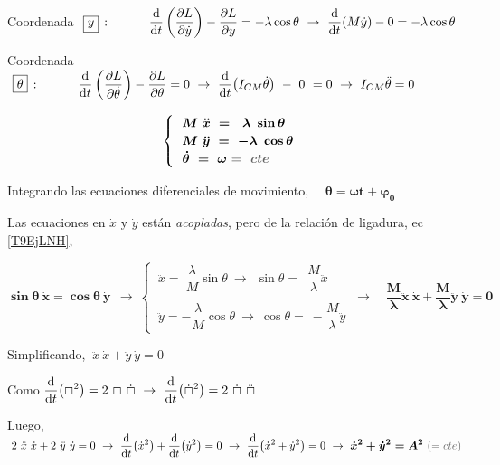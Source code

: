 \begin{example}
Coordenada $\ \boxed{  y  }\,: \quad  \qquad  \displaystyle \dv{t} \left( \pdv{L}{\dot y} \right) - \pdv{L}{y} = -\lambda \cos \theta \ \to \ \dv{t} (M\dot y) - 0 = -\lambda \cos \theta$

Coordenada $\ \boxed{  \theta  }\,: \quad  \qquad  \displaystyle \dv{t} \left( \pdv{L}{\dot \theta} \right) - \pdv{L}{\theta} = 0 \ \to \ \dv{t} (I_{CM} \dot \theta) \ - \ 0 \  = 0 \ \to \ I_{CM} \ddot \theta =0$

\vspace{2mm}
\begin{equation}
	\label{T9EjEcMov}
	\boldsymbol{
	\begin{cases} 
		\ \ M \ \ddot x \ = \ \  \lambda \ \sin \theta \\
		\ \  M \ \ddot y \ = \ - \lambda \ \cos \theta \\
		\ \ \dot \theta \ = \  \omega  \ \textcolor{gris}{ = \  cte}
	\end{cases} 
	}
\end{equation}


\vspace{2mm} Integrando las ecuaciones diferenciales de movimiento,
$\quad \boxed{ \boldsymbol{\theta=\omega t + \varphi_0} \ }$

\vspace{2mm}Las ecuaciones en $\dot x \text{ y } \dot{y} $ están \emph{acopladas}, pero de la relación de ligadura, ec \ref{T9EjLNH},

\vspace{2mm}$\boldsymbol{\sin \theta \ \dot x = \cos 	\theta \ \dot y}  \ \ \to \ \begin{cases}
 \ \ddot x = \ \dfrac \lambda M \sin \theta	\ \to \ \ \sin \theta = \ \ \dfrac M \lambda \ddot x\\  \\ 
 \ \ddot y = - \dfrac \lambda M \cos \theta \ \to \ \cos \theta = \ - \dfrac M \lambda \ddot y 
 \end{cases}
 \ \to \quad  \boldsymbol{\dfrac M \lambda \ddot x \ \dot x +  \dfrac M \lambda \ddot y \ \dot y =0}$

\vspace{2mm}Simplificando, $\ \ddot x \ \dot x+\ddot y \ \dot y=0$

\vspace{2mm}Como $\displaystyle \dv{t}( \Box ^2) = 2 \ \Box \ \dot{\Box} \ \to \ 
\dv{t}( \dot{\Box}^2 )  =2 \ \dot{\Box} \ \ddot{\Box}$

\vspace{2mm}Luego, $\ 2 \ \ddot x \ \dot x+ 2 \ \ddot y \ \dot y=0 \ \to \ \displaystyle
\dv{t} (\dot x^2) + \dv{t} (\dot y^2) =0 \ \to \ 
\dv{t} (\dot x^2+\dot y^2)=0 \ \to \ 
\boldsymbol{\dot x^2+\dot y^2 = A^2} \ \textcolor{gris}{(=cte)}$
 


\end{example}
